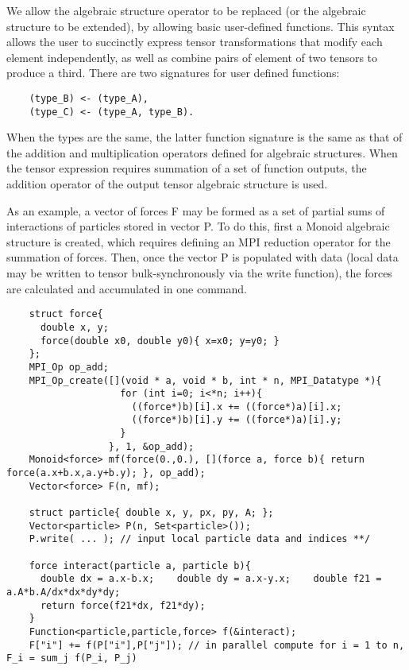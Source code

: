 We allow the algebraic structure operator to be replaced (or the algebraic structure to be extended), by allowing basic user-defined functions.
This syntax allows the user to succinctly express tensor transformations that modify each element independently, as well as combine pairs of element of two tensors to produce a third.
There are two signatures for user defined functions:
\begin{lstlisting}
    (type_B) <- (type_A),
    (type_C) <- (type_A, type_B).
\end{lstlisting}
When the types are the same, the latter function signature is the same as that of the addition and multiplication operators defined for algebraic structures.
When the tensor expression requires summation of a set of function outputs, the addition operator of the output tensor algebraic structure is used.

As an example, a vector of forces {\CD F} may be formed as a set of partial sums of interactions of particles stored in vector {\CD P}.
To do this, first a {\kwstyle Monoid} algebraic structure is created, which requires defining an MPI reduction operator for the summation of forces.
Then, once the vector {\CD P} is populated with data (local data may be written to tensor bulk-synchronously via the {\kwstyle write} function), the forces are calculated and accumulated in one command.
\begin{lstlisting}
    struct force{
      double x, y; 
      force(double x0, double y0){ x=x0; y=y0; }
    };
    MPI_Op op_add;
    MPI_Op_create([](void * a, void * b, int * n, MPI_Datatype *){
                    for (int i=0; i<*n; i++){
                      ((force*)b)[i].x += ((force*)a)[i].x;
                      ((force*)b)[i].y += ((force*)a)[i].y;
                    }
                  }, 1, &op_add);
    Monoid<force> mf(force(0.,0.), [](force a, force b){ return force(a.x+b.x,a.y+b.y); }, op_add);
    Vector<force> F(n, mf);
    
    struct particle{ double x, y, px, py, A; };
    Vector<particle> P(n, Set<particle>());
    P.write( ... ); // input local particle data and indices **/ 

    force interact(particle a, particle b){
      double dx = a.x-b.x;    double dy = a.x-y.x;    double f21 = a.A*b.A/dx*dx*dy*dy;
      return force(f21*dx, f21*dy);
    }
    Function<particle,particle,force> f(&interact);
    F["i"] += f(P["i"],P["j"]); // in parallel compute for i = 1 to n, F_i = sum_j f(P_i, P_j)
\end{lstlisting}

